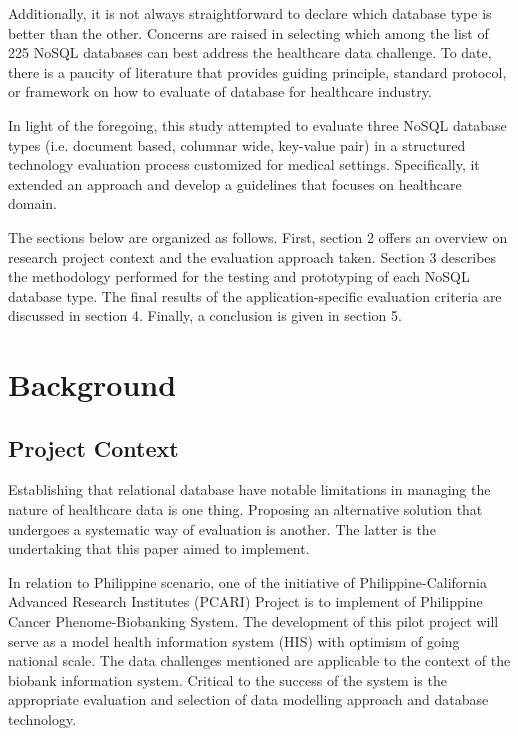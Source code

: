 \documentclass[5p]{elsarticle}
\begin{document}
Additionally, it is not always straightforward to declare which database type is better than the other. Concerns are raised in selecting which among the list of 225 NoSQL databases \cite{S.Edlich2018} 
can best address the healthcare data challenge. To date, there is a paucity of literature that provides guiding principle, standard protocol, or framework on how to
evaluate of database for healthcare industry.

In light of the foregoing, this study attempted to evaluate three NoSQL database types (i.e. document based, columnar wide, key-value pair) 
in a structured technology evaluation process customized for medical settings. Specifically, it extended an approach 
and develop a guidelines that focuses on healthcare domain.

The sections below are organized as follows.
First, section 2 offers an overview on research project context and the evaluation approach taken. 
Section 3 describes the methodology performed for the testing and prototyping of each NoSQL database type.
The final results of the application-specific evaluation criteria are discussed in section 4. 
Finally, a conclusion is given in section 5.

\section{Background}
\subsection{Project Context}
Establishing that relational database have notable limitations in managing the nature of healthcare data \cite{Z.Goli-Malekabadi201675,K.Lee201299,H.Al-Fatlawi2015122,O.Schmitt20121,Y.Jin2011288} is one thing. 
Proposing an alternative solution that undergoes a systematic way of evaluation is another. The latter is the undertaking that this paper aimed to implement.

In relation to Philippine scenario, one of the initiative of Philippine-California Advanced Research Institutes (PCARI) Project is to implement 
of Philippine Cancer Phenome-Biobanking System. The development of this pilot project will serve as a model health information system (HIS) with optimism 
of going national scale. The data challenges mentioned are applicable to the context of the biobank information system. 
Critical to the success of the system is the appropriate evaluation and selection of data modelling approach and database technology.
\end{document}
